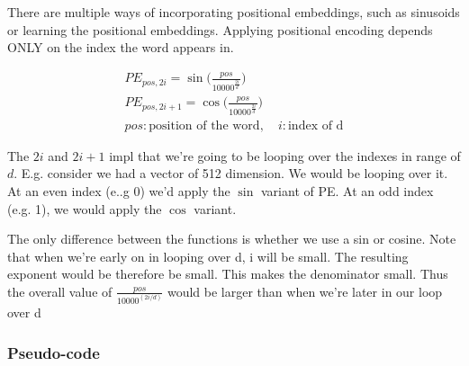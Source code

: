 \documentclass[11pt]{article}
\begin{document}
There are multiple ways of incorporating positional embeddings, such as sinusoids or learning the positional embeddings. Applying positional encoding depends ONLY on the index the word appears in.

\begin{minipage}[l]{.5\linewidth}
    \begin{gather*}
        PE_{pos,2i}=\sin\Bigg(\frac{pos}{10000^{\frac{2i}{d}}}\Bigg) \\ 
        PE_{pos,2i+1}=\cos\Bigg(\frac{pos}{10000^{\frac{2i}{d}}}\Bigg) \\ 
        pos: \text{position of the word}, \quad i: \text{index of d}
    \end{gather*}
\end{minipage}\hfill
\begin{minipage}[r]{.5\linewidth}
    The $2i$ and $2i+1$ impl that we're going to be looping over the indexes in range of $d$. E.g. consider we had a vector of 512 dimension. We would be looping over it. At an even index (e..g 0) we'd apply the $\sin$ variant of PE. At an odd index (e.g. 1), we would apply the $\cos$ variant. 
\end{minipage}

The only difference between the functions is whether we use a sin or cosine. Note that when we're early on in looping over d, i will be small. The
resulting exponent would be therefore be small. This makes the denominator small. Thus the overall value of $\frac{pos}{10000^{(2i/d)}}$ would be larger than when we're later in our loop over d

\subsubsection{Pseudo-code}
\end{document}
